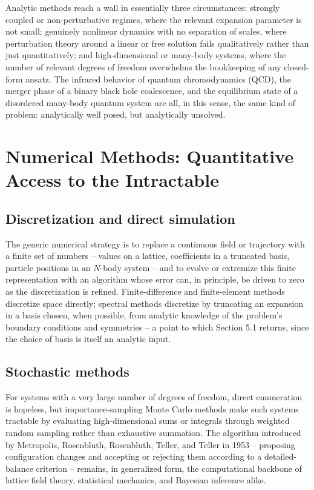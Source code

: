 \documentclass[11pt]{article}
\begin{document}
Analytic methods reach a wall in essentially three circumstances: strongly coupled or non-perturbative regimes, where the relevant expansion parameter is not small; genuinely nonlinear dynamics with no separation of scales, where perturbation theory around a linear or free solution fails qualitatively rather than just quantitatively; and high-dimensional or many-body systems, where the number of relevant degrees of freedom overwhelms the bookkeeping of any closed-form ansatz. The infrared behavior of quantum chromodynamics (QCD), the merger phase of a binary black hole coalescence, and the equilibrium state of a disordered many-body quantum system are all, in this sense, the same kind of problem: analytically well posed, but analytically unsolved.

\section{Numerical Methods: Quantitative Access to the Intractable}

\subsection{Discretization and direct simulation}

The generic numerical strategy is to replace a continuous field or trajectory with a finite set of numbers -- values on a lattice, coefficients in a truncated basis, particle positions in an $N$-body system -- and to evolve or extremize this finite representation with an algorithm whose error can, in principle, be driven to zero as the discretization is refined. Finite-difference and finite-element methods discretize space directly; spectral methods discretize by truncating an expansion in a basis chosen, when possible, from analytic knowledge of the problem's boundary conditions and symmetries -- a point to which Section 5.1 returns, since the choice of basis is itself an analytic input.

\subsection{Stochastic methods}

For systems with a very large number of degrees of freedom, direct enumeration is hopeless, but importance-sampling Monte Carlo methods make such systems tractable by evaluating high-dimensional sums or integrals through weighted random sampling rather than exhaustive summation. The algorithm introduced by Metropolis, Rosenbluth, Rosenbluth, Teller, and Teller in 1953 \cite{Metropolis1953} -- proposing configuration changes and accepting or rejecting them according to a detailed-balance criterion -- remains, in generalized form, the computational backbone of lattice field theory, statistical mechanics, and Bayesian inference alike.
\end{document}
